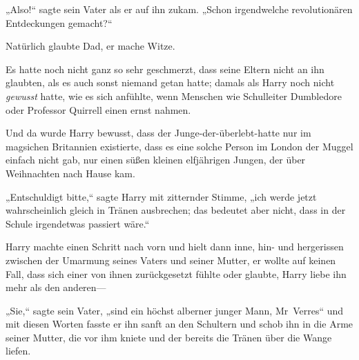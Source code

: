„Also!“ sagte sein Vater als er auf ihn zukam. „Schon irgendwelche revolutionären Entdeckungen gemacht?“

Natürlich glaubte Dad, er mache Witze.

Es hatte noch nicht ganz so sehr geschmerzt, dass seine Eltern nicht an ihn glaubten, als es auch sonst niemand getan hatte; damals als Harry noch nicht \emph{gewusst} hatte, wie es sich anfühlte, wenn Menschen wie Schulleiter Dumbledore oder Professor Quirrell einen ernst nahmen.

Und da wurde Harry bewusst, dass der Junge-der-überlebt-hatte nur im magsichen Britannien existierte, dass es eine solche Person im London der Muggel einfach nicht gab, nur einen süßen kleinen elfjährigen Jungen, der über Weihnachten nach Hause kam.

„Entschuldigt bitte,“ sagte Harry mit zitternder Stimme, „ich werde jetzt wahrscheinlich gleich in Tränen ausbrechen; das bedeutet aber nicht, dass in der Schule irgendetwas passiert wäre.“

Harry machte einen Schritt nach vorn und hielt dann inne, hin- und hergerissen zwischen der Umarmung seines Vaters und seiner Mutter, er wollte auf keinen Fall, dass sich einer von ihnen zurückgesetzt fühlte oder glaubte, Harry liebe ihn mehr als den anderen—

„Sie,“ sagte sein Vater, „sind ein höchst alberner junger Mann, Mr~Verres“ und mit diesen Worten fasste er ihn sanft an den Schultern und schob ihn in die Arme seiner Mutter, die vor ihm kniete und der bereits die Tränen über die Wange liefen.

